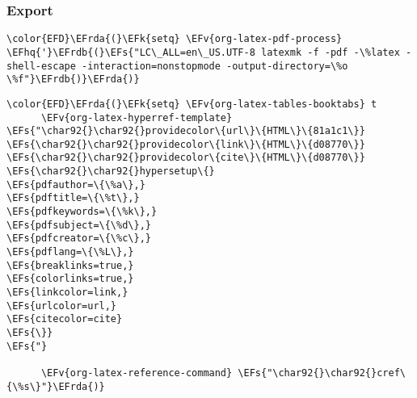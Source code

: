 \documentclass[c]{article}
\theoremstyle{plain}%
\theoremstyle{definition}
\theoremstyle{remark}
\newcommand{\EFs}[1]{\textcolor{EFs}{#1}} %
\newcommand{\EFk}[1]{\textcolor{EFk}{#1}} %
\newcommand{\EFv}[1]{\textcolor{EFv}{#1}} %
\newcommand{\EFhq}[1]{\textcolor{EFhq}{#1}} %
\newcommand{\EFrda}[1]{\textcolor{EFrda}{#1}} %
\newcommand{\EFrdb}[1]{\textcolor{EFrdb}{#1}} %
\begin{document}
\subsubsection{Export}
\label{sec:orgf52580f}
\begin{Code}
\begin{Verbatim}
\color{EFD}\EFrda{(}\EFk{setq} \EFv{org-latex-pdf-process} \EFhq{'}\EFrdb{(}\EFs{"LC\_ALL=en\_US.UTF-8 latexmk -f -pdf -\%latex -shell-escape -interaction=nonstopmode -output-directory=\%o \%f"}\EFrdb{)}\EFrda{)}
\end{Verbatim}
\end{Code}
\begin{Code}
\begin{Verbatim}
\color{EFD}\EFrda{(}\EFk{setq} \EFv{org-latex-tables-booktabs} t
      \EFv{org-latex-hyperref-template} \EFs{"\char92{}\char92{}providecolor\{url\}\{HTML\}\{81a1c1\}}
\EFs{\char92{}\char92{}providecolor\{link\}\{HTML\}\{d08770\}}
\EFs{\char92{}\char92{}providecolor\{cite\}\{HTML\}\{d08770\}}
\EFs{\char92{}\char92{}hypersetup\{}
\EFs{pdfauthor=\{\%a\},}
\EFs{pdftitle=\{\%t\},}
\EFs{pdfkeywords=\{\%k\},}
\EFs{pdfsubject=\{\%d\},}
\EFs{pdfcreator=\{\%c\},}
\EFs{pdflang=\{\%L\},}
\EFs{breaklinks=true,}
\EFs{colorlinks=true,}
\EFs{linkcolor=link,}
\EFs{urlcolor=url,}
\EFs{citecolor=cite}
\EFs{\}}
\EFs{"}

      \EFv{org-latex-reference-command} \EFs{"\char92{}\char92{}cref\{\%s\}"}\EFrda{)}
\end{Verbatim}
\end{Code}
\end{document}
